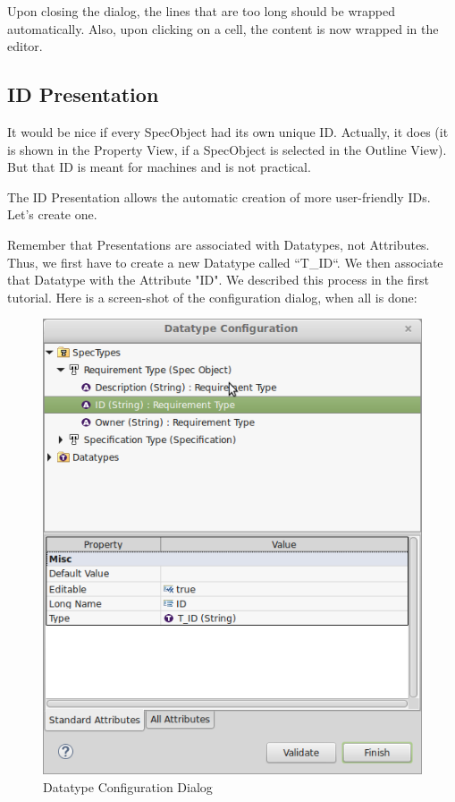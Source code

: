 Upon closing the dialog, the lines that are too long should be wrapped automatically.  Also, upon clicking on a cell, the content is now wrapped in the editor.

\subsection{ID Presentation}

It would be nice if every SpecObject had its own unique ID.  Actually, it does (it is shown in the Property View, if a SpecObject is selected in
the Outline View).  But that ID is meant for machines and is not practical.

The ID Presentation allows the automatic creation of more user-friendly IDs.  Let's create one.

Remember that Presentations are associated with Datatypes, not Attributes.  Thus, we first have to create a new Datatype called ``T\_ID``.  We then associate that Datatype with the Attribute "ID".  We described this process in the first tutorial.  Here is a screen-shot of the configuration dialog, when all is done:

\begin{figure}[h!]
\centering      
\includegraphics[width=0.8\linewidth]{../rmf-images/t_id.png}      
\caption{Datatype Configuration Dialog}      
\label{fig:datatypeConfig}
\end{figure}

